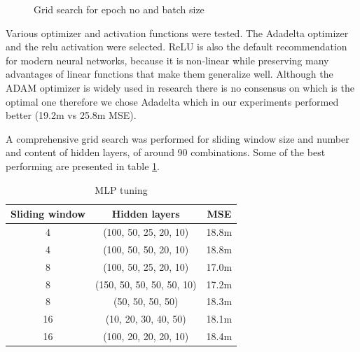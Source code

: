 \documentclass[12pt]{article}
\begin{document}
\begin{figure}
    \caption{Grid search for epoch no and batch size}
    \label{fig:epochs_batch_scaled}
\end{figure}

Various optimizer and activation functions were tested. The Adadelta optimizer and the relu activation were selected. ReLU is also the default recommendation\cite{mit_dlbook} for modern neural networks, because it is non-linear while preserving many advantages of linear functions that make them generalize well. Although the ADAM optimizer is widely used in research there is no consensus on which is the optimal one\cite{mit_dlbook} therefore we chose Adadelta which in our experiments performed better (19.2m vs 25.8m MSE).

A comprehensive grid search was performed for sliding window size and number and content of hidden layers, of around 90 combinations. Some of the best performing are presented in table \ref{tab:mlp_tune}.

\begin{table}[htbp]
\caption{MLP tuning}
\begin{center}
\begin{tabular}{|c|c|c|}
\hline
Sliding window & Hidden layers & MSE \\
\hline
4 & (100, 50, 25, 20, 10) & 18.8m\\
\hline
4 & (100, 50, 50, 20, 10) & 18.8m\\
\hline
8 & (100, 50, 25, 20, 10) & 17.0m\\
\hline
8 & (150, 50, 50, 50, 50, 10) & 17.2m\\
\hline
8 & (50, 50, 50, 50) & 18.3m\\
\hline
16 & (10, 20, 30, 40, 50) & 18.1m\\
\hline
16 & (100, 20, 20, 20, 10) & 18.4m\\
\hline
\end{tabular}
\label{tab:mlp_tune}
\end{center}
\end{table}
\end{document}

